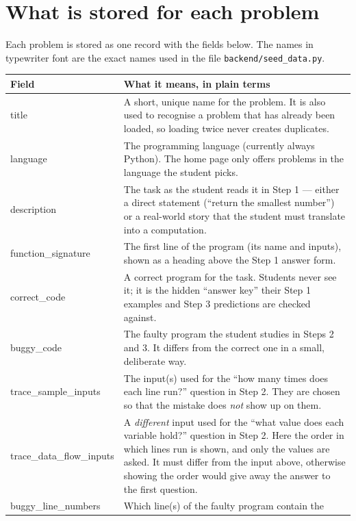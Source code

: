 \documentclass[11pt,a4paper]{article}
\begin{document}
\section{What is stored for each problem}

Each problem is stored as one record with the fields below. The names in
typewriter font are the exact names used in the file
\texttt{backend/seed\_data.py}.

\medskip
\noindent
\begin{tabularx}{\textwidth}{@{}>{\ttfamily\raggedright}p{4.8cm}L@{}}
\toprule
\normalfont\textbf{Field} & \textbf{What it means, in plain terms} \\
\midrule
title & A short, unique name for the problem. It is also used to recognise
  a problem that has already been loaded, so loading twice never creates
  duplicates. \\
language & The programming language (currently always Python). The home
  page only offers problems in the language the student picks. \\
description & The task as the student reads it in Step 1 --- either a
  direct statement (``return the smallest number'') or a real-world story
  that the student must translate into a computation. \\
function\_signature & The first line of the program (its name and inputs),
  shown as a heading above the Step 1 answer form. \\
correct\_code & A correct program for the task. Students never see it; it
  is the hidden ``answer key'' their Step 1 examples and Step 3
  predictions are checked against. \\
buggy\_code & The faulty program the student studies in Steps 2 and 3. It
  differs from the correct one in a small, deliberate way. \\
trace\_sample\_inputs & The input(s) used for the ``how many times does
  each line run?'' question in Step 2. They are chosen so that the
  mistake does \emph{not} show up on them. \\
trace\_data\_flow\_\newline inputs & A \emph{different} input used for the ``what
  value does each variable hold?'' question in Step 2. Here the order in
  which lines run is shown, and only the values are asked. It must differ
  from the input above, otherwise showing the order would give away the
  answer to the first question. \\
buggy\_line\_numbers & Which line(s) of the faulty program contain the

\end{tabularx}
\end{document}
